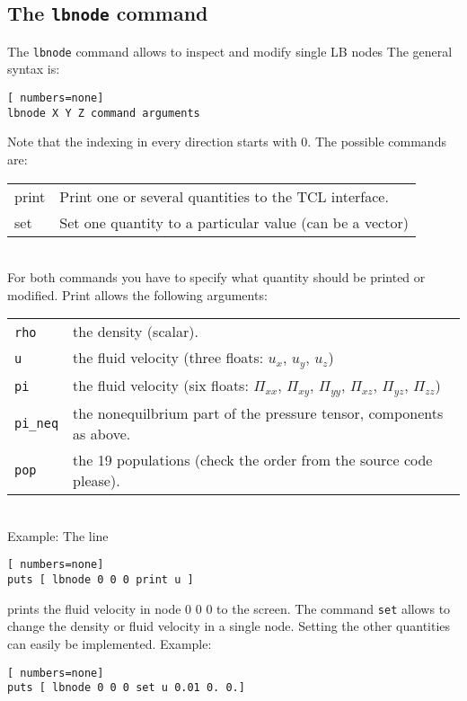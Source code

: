 \subsection*{The {\tt lbnode} command}
The {\tt lbnode} command allows to inspect and modify single LB nodes The
general syntax is:
\vspace{0,2cm}
\begin{lstlisting}[ numbers=none]
lbnode X Y Z command arguments
\end{lstlisting}
\vspace{0,2cm}
Note that the indexing in every direction starts with 0. The possible commands are:
\vspace{0,8cm}
\begin{tabular}{p{}p{}}
  print & Print one or several quantities to the TCL interface.\\
  set & Set one quantity to a particular value (can be a vector)\\
\end{tabular}\\
\vspace{0,8cm}
For both commands you have to specify what quantity should be printed
or modified. Print allows the following arguments: \\


\vspace{0,8cm}
\begin{tabular}{p{}p{}}
  {\tt rho}\ & the density (scalar). \\
  {\tt u} & the fluid velocity (three floats: $u_x$, $u_y$, $u_z$) \\
  {\tt pi} & the fluid velocity (six floats: $\Pi_{xx}$, $\Pi_{xy}$, $\Pi_{yy}$, $\Pi_{xz}$,  $\Pi_{yz}$,  $\Pi_{zz}$) \\
  {\tt pi\_neq} & the nonequilbrium part of the pressure tensor, components as above. \\
  {\tt pop} & the 19 populations (check the order from the source code please).
\end{tabular} \\
\vspace{0,8cm}
Example:
The line
\vspace{0,2cm}
\begin{lstlisting}[ numbers=none]
puts [ lbnode 0 0 0 print u ]
\end{lstlisting}
\vspace{0,2cm}
prints the fluid velocity in node 0 0 0 to the screen.
The command {\tt set} allows to change the density or fluid velocity in a single node. Setting
the other quantities can easily be implemented.
Example:
\begin{lstlisting}[ numbers=none]
puts [ lbnode 0 0 0 set u 0.01 0. 0.]
\end{lstlisting}
